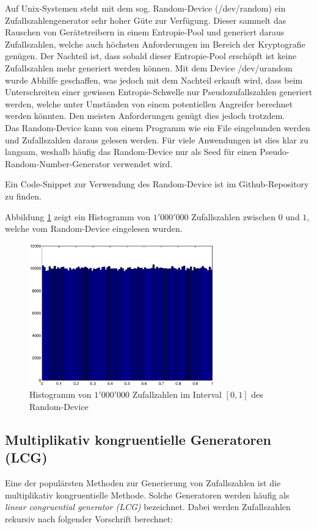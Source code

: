 \documentclass{book}
\begin{document}
\begin{refsection}
Auf Unix-Systemen steht mit dem sog. Random-Device (/dev/random) ein Zufallszahlengenerator sehr hoher Güte zur Verfügung. Dieser sammelt das Rauschen von Gerätetreibern in einem Entropie-Pool und generiert daraus Zufallszahlen, welche auch höchsten Anforderungen im Bereich der Kryptografie genügen. Der Nachteil ist, dass sobald dieser Entropie-Pool erschöpft ist keine Zufallszahlen mehr generiert werden können. Mit dem Device /dev/urandom wurde Abhilfe geschaffen, was jedoch mit dem Nachteil erkauft wird, dass beim Unterschreiten einer gewissen Entropie-Schwelle nur Pseudozufallszahlen generiert werden, welche unter Umständen von einem potentiellen Angreifer berechnet werden könnten. Den meisten Anforderungen genügt dies jedoch trotzdem. \\

Das Random-Device kann von einem Programm wie ein File eingebunden werden und Zufallszahlen daraus gelesen werden. Für viele Anwendungen ist dies klar zu langsam, weshalb häufig das Random-Device nur als Seed für einen Pseudo-Random-Number-Generator verwendet wird.

Ein Code-Snippet zur Verwendung des Random-Device ist im Github-Repository \cite{rng:githubRepo} zu finden.

Abbildung \ref{fig:dev_rand_histogram} zeigt ein Histogramm von $1'000'000$ Zufallszahlen zwischen $0$ und $1$, welche vom Random-Device eingelesen wurden.

\begin{figure}[htbp]
	\centering
	\includegraphics[width=8cm]{images/dev_rand_histogram.eps}
	\caption{Histogramm von $1'000'000$ Zufallzahlen im Interval $[0,1]$ des Random-Device}
	\label{fig:dev_rand_histogram}
\end{figure}

\newpage
\subsection{Multiplikativ kongruentielle Generatoren (LCG)} \label{subsec:LCG}
Eine der populärsten Methoden zur Generierung von Zufallszahlen ist die multiplikativ kongruentielle Methode. Solche Generatoren werden häufig als \textit{linear congruential generator (LCG)} bezeichnet. Dabei werden Zufallszahlen rekursiv nach folgender Vorschrift berechnet:


\end{refsection}
\end{document}
